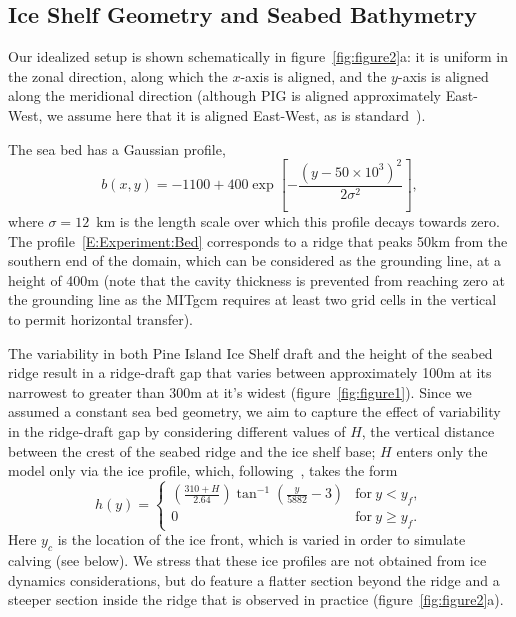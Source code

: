 \documentclass[draft]{agujournal2019}
\begin{document}
\subsection{Ice Shelf Geometry and Seabed Bathymetry}\label{S:Experiment:Geometry}
Our idealized setup is shown schematically in figure~\ref{fig:figure2}a: it is uniform in the zonal direction, along which the $x$-axis is aligned, and the $y$-axis is aligned along the meridional direction (although PIG is aligned approximately East-West, we assume here that it is aligned East-West, as is standard~\cite{Grosfeld1997JGROceans, DeRydt2014JGeophysResOceans}).

The sea bed has a Gaussian profile,
\begin{equation}\label{E:Experiment:Bed}
    b(x,y) = -1100 + 400 \exp\left[-\frac{\left(y - 50\times 10^3\right)^2}{2\sigma^2}\right],
\end{equation}
where $\sigma = 12$~km is the length scale over which this profile decays towards zero. The profile~\eqref{E:Experiment:Bed} corresponds to a ridge that peaks 50km from the southern end of the domain, which can be considered as the grounding line, at a height of 400m (note that the cavity thickness is prevented from reaching zero at the grounding line as the MITgcm requires at least two grid cells in the vertical to permit horizontal transfer). 

The variability in both Pine Island Ice Shelf draft and the height of the seabed ridge result in a ridge-draft gap that varies between approximately 100m at its narrowest to greater than 300m at it's widest (figure~\ref{fig:figure1}). Since we assumed a constant sea bed geometry, we aim to capture the effect of variability in the ridge-draft gap by considering different values of $H$, the vertical distance between the crest of the seabed ridge and the ice shelf base; $H$ enters only the model only via the ice profile, which, following~, takes the form
\begin{equation}
    h(y) = \begin{cases}
    \left(\frac{310 + H}{2.64}\right)\tan^{-1}\left(\frac{y}{5882} -3\right) & \text{for}~y < y_f,\\
    0  & \text{for}~y \geq y_f.
    \end{cases}
\end{equation}
Here $y_c$ is the location of the ice front, which is varied in order to simulate calving (see below). We stress that these ice profiles are not obtained from ice dynamics considerations, but do feature a flatter section beyond the ridge and a steeper section inside the ridge that is observed in practice (figure~\ref{fig:figure2}a).
\end{document}

